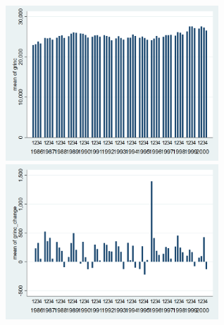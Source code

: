 \documentclass[12pt,a4paper]{article}
\begin{document}
\begin{center}
\includegraphics[width=8cm]{grinc_quarterly.png}
\includegraphics[width=8cm]{grinc_change_quarterly.png}\\
\end{center}
\end{document}
